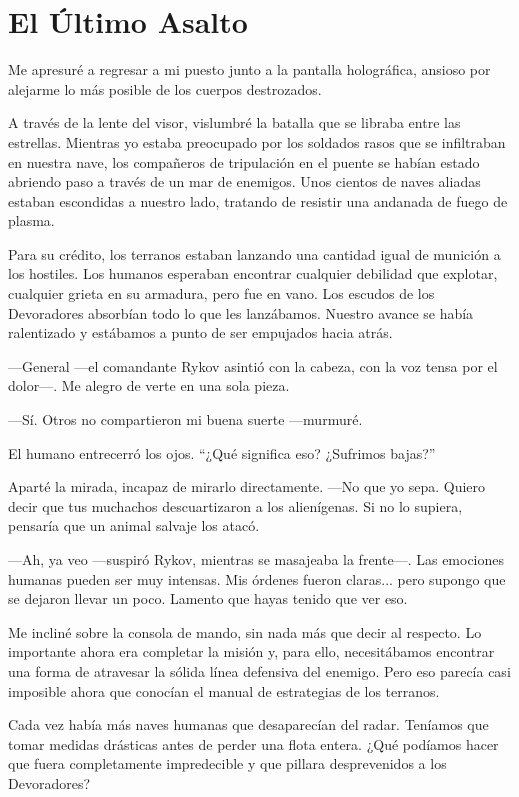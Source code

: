 \chapter{El Último Asalto}\label{sec:el-ultimo-asalto}

Me apresuré a regresar a mi puesto junto a la pantalla holográfica, ansioso por alejarme lo más posible de los cuerpos destrozados.

A través de la lente del visor, vislumbré la batalla que se libraba entre las estrellas. Mientras yo estaba preocupado por los soldados rasos que se infiltraban en nuestra nave, los compañeros de tripulación en el puente se habían estado abriendo paso a través de un mar de enemigos. Unos cientos de naves aliadas estaban escondidas a nuestro lado, tratando de resistir una andanada de fuego de plasma.

Para su crédito, los terranos estaban lanzando una cantidad igual de munición a los hostiles. Los humanos esperaban encontrar cualquier debilidad que explotar, cualquier grieta en su armadura, pero fue en vano. Los escudos de los Devoradores absorbían todo lo que les lanzábamos. Nuestro avance se había ralentizado y estábamos a punto de ser empujados hacia atrás.

—General —el comandante Rykov asintió con la cabeza, con la voz tensa por el dolor—. Me alegro de verte en una sola pieza.

—Sí. Otros no compartieron mi buena suerte —murmuré.

El humano entrecerró los ojos. ``¿Qué significa eso? ¿Sufrimos bajas?''

Aparté la mirada, incapaz de mirarlo directamente. —No que yo sepa. Quiero decir que tus muchachos descuartizaron a los alienígenas. Si no lo supiera, pensaría que un animal salvaje los atacó.

—Ah, ya veo —suspiró Rykov, mientras se masajeaba la frente—. Las emociones humanas pueden ser muy intensas. Mis órdenes fueron claras... pero supongo que se dejaron llevar un poco. Lamento que hayas tenido que ver eso.

Me incliné sobre la consola de mando, sin nada más que decir al respecto. Lo importante ahora era completar la misión y, para ello, necesitábamos encontrar una forma de atravesar la sólida línea defensiva del enemigo. Pero eso parecía casi imposible ahora que conocían el manual de estrategias de los terranos.

Cada vez había más naves humanas que desaparecían del radar. Teníamos que tomar medidas drásticas antes de perder una flota entera. ¿Qué podíamos hacer que fuera completamente impredecible y que pillara desprevenidos a los Devoradores?

